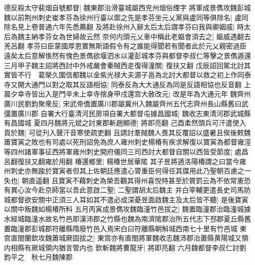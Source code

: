 德反殺太守裴烟自號都督|{
	魏東郡治滑臺城屬西兖州烟俗煙字}
將軍成景儁攻魏彭城魏以前荆州刺史崔孝芬為徐州行臺以禦之先是孝芬坐元乂黨與盧同等俱除名|{
	盧同除名見上卷普通六年先悉薦翻}
及將赴徐州入辭太后太后謂孝芬曰我與卿姻戚|{
	時太后為魏主納孝芬女為世婦故云然}
奈何内頭元乂車中稱此老嫗會須去之|{
	嫗威遇翻去羌呂翻}
孝芬曰臣蒙國厚恩實無斯語假令有之誰能得聞若有聞者此於元乂親密過臣遠矣太后意解悵然有愧色景儁欲堰泗水以灌彭城孝芬與都督李叔仁等擊之景儁遁還　三月甲子魏主詔將西討中外戒嚴會秦賊西走復得潼關|{
	復扶又翻}
戊辰詔回駕北討其實皆不行　葛榮久圍信都魏以金紫光禄大夫源子邕為北討大都督以救之初上作同泰寺又開大通門以對之取其反語相協|{
	同泰反為大大通反為同是反語相協也反音翻}
上晨夕幸寺皆出入是門辛未上幸寺捨身甲戌還宫大赦改元|{
	改是年為大通元年}
魏齊州廣川民劉鈞聚衆反|{
	宋武帝僑置廣川郡屬冀州入魏屬齊州五代志齊州長山縣舊曰武彊置廣川郡}
自署大行臺清河民房項自署大都督屯據昌國城|{
	魏收志東清河郡武城縣有昌國城}
夏四月魏將元斌之討東郡斬趙顯德|{
	將即亮翻}
己酉柔然頭兵可汗遣使入貢於魏|{
	可從刋入聲汗音寒使疏吏翻}
且請討羣賊魏人畏其反覆詔以盛暑且俟後敕魏蕭寶寅之敗也有司處以死刑詔免為庶人雍州刺史楊椿有疾求解復以寶寅為都督雍涇等四州諸軍事征西將軍雍州刺史開府儀同三司西討大都督自關以西皆受節度|{
	處昌呂翻復扶又翻雍於用翻}
椿還鄉里|{
	楊椿世居華隂}
其子昱將適洛陽椿謂之曰當今雍州刺史亦無踰於寶寅者但其上佐朝廷應遣心膂重臣何得任其牒用此乃聖朝百慮之一失也|{
	朝直遥翻}
且寶寅不藉刺史為榮吾觀其得州喜悦特甚至於賞罰云為不依常憲恐有異心汝今赴京師當以吾此意啟二聖|{
	二聖謂胡太后魏主}
并白宰輔更遣長史司馬防城都督欲安關中正須三人耳如其不遣必成深憂昱面啟魏主及太后皆不聽|{
	是後寶寅以關中叛魏如楊椿所料}
五月丙寅成景儁攻魏臨潼竹邑拔之|{
	魏置臨潼郡治臨潼城據水經城臨潼水故名竹邑即漢沛郡之竹縣也魏為南濟隂郡治所五代志下邳郡夏丘縣舊置臨潼郡彭城郡符離縣隋廢竹邑入焉宋白曰符離縣朝斛城西南七十里有竹邑城}
東宫直閤蘭欽攻魏蕭城厥固拔之|{
	東宫亦有直閤將軍魏收志魏沛郡治蕭縣黄陽城又領内相縣有厥城領内猶言管内也}
欽斬魏將曹龍牙|{
	將即亮翻}
六月魏都督李叔仁討劉鈞平之　秋七月魏陳郡

